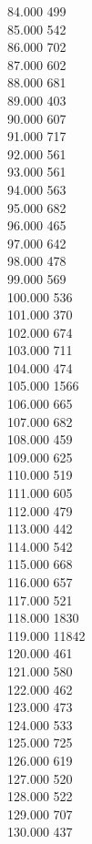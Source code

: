 { 84.000	499 \\
 85.000	542 \\
 86.000	702 \\
 87.000	602 \\
 88.000	681 \\
 89.000	403 \\
 90.000	607 \\
 91.000	717 \\
 92.000	561 \\
 93.000	561 \\
 94.000	563 \\
 95.000	682 \\
 96.000	465 \\
 97.000	642 \\
 98.000	478 \\
 99.000	569 \\
 100.000	536 \\
 101.000	370 \\
 102.000	674 \\
 103.000	711 \\
 104.000	474 \\
 105.000	1566 \\
 106.000	665 \\
 107.000	682 \\
 108.000	459 \\
 109.000	625 \\
 110.000	519 \\
 111.000	605 \\
 112.000	479 \\
 113.000	442 \\
 114.000	542 \\
 115.000	668 \\
 116.000	657 \\
 117.000	521 \\
 118.000	1830 \\
 119.000	11842 \\
 120.000	461 \\
 121.000	580 \\
 122.000	462 \\
 123.000	473 \\
 124.000	533 \\
 125.000	725 \\
 126.000	619 \\
 127.000	520 \\
 128.000	522 \\
 129.000	707 \\
 130.000	437 \\
}

